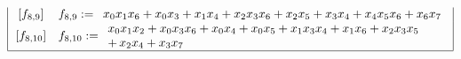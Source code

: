 \documentclass[12pt,a4paper]{article}
\begin{document}
\begin{align*}
\begin{array}{|cl|}
\,[f_{ 8 , 9 }] & f_{ 8 , 9 } :=
\begin{array}{l}
x_{0} x_{1} x_{6} + x_{0} x_{3} + x_{1} x_{4} + x_{2} x_{3} x_{6} + x_{2} x_{5} + x_{3} x_{4} +
x_{4} x_{5} x_{6} + x_{6} x_{7}
\end{array}
\\
\,[f_{ 8 , 10 }] & f_{ 8 , 10 } :=
\begin{array}{l}
x_{0} x_{1} x_{2} + x_{0} x_{3} x_{6} + x_{0} x_{4} + x_{0} x_{5} + x_{1} x_{3} x_{4} + x_{1} x_{6}
+ x_{2} x_{3} x_{5}
\\
+\, x_{2} x_{4} + x_{3} x_{7}
\end{array}
\\
\hline
\end{array}
\end{align*}
\normalsize{}
\end{document}
